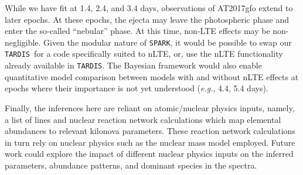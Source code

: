 \documentclass[twocolumn,twocolappendix]{aastex63}
\def\SPARK{\texttt{SPARK}}
\def\TARDIS{\texttt{TARDIS}}
\def\eg{{\it e.g.}}
\begin{document}
While we have fit at 1.4, 2.4, and 3.4 days, observations of AT2017gfo extend to later epochs. At these epochs, the ejecta may leave the photospheric phase and enter the so-called ``nebular'' phase. At this time, non-LTE effects may be non-negligible. Given the modular nature of \SPARK, it would be possible to swap our \TARDIS~for a code specifically suited to nLTE, or, use the nLTE functionality already available in \TARDIS. The Bayesian framework would also enable quantitative model comparison between models with and without nLTE effects at epochs where their importance is not yet understood (\eg, 4.4, 5.4 days). 

Finally, the inferences here are reliant on atomic/nuclear physics inputs, namely, a list of lines and nuclear reaction network calculations which map elemental abundances to relevant kilonova parameters. These reaction network calculations in turn rely on nuclear physics such as the nuclear mass model employed. Future work could explore the impact of different nuclear physics inputs on the inferred parameters, abundance patterns, and dominant species in the spectra. 

    


\end{document}
